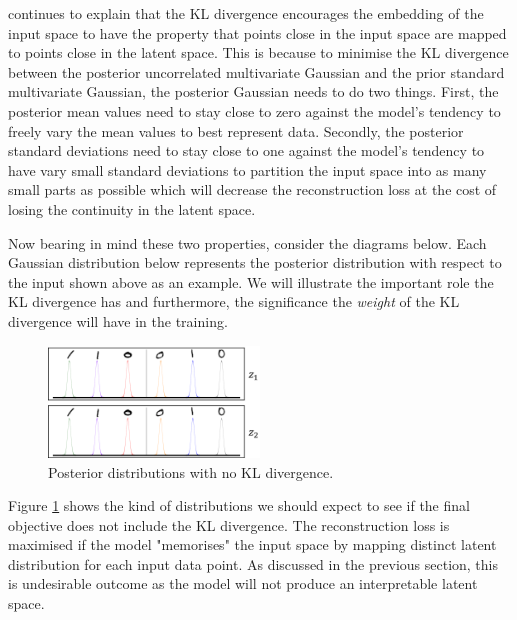             \cite{burgess2018understanding} continues to explain that the KL divergence encourages the embedding of the input space to have the property that points close in the input space are mapped to points close in the latent space. This is because to minimise the KL divergence between the posterior uncorrelated multivariate Gaussian and the prior standard multivariate Gaussian, the posterior Gaussian needs to do two things. First, the posterior mean values need to stay close to zero against the model's tendency to freely vary the mean values to best represent data. Secondly, the posterior standard deviations need to stay close to one against the model's tendency to have vary small standard deviations to partition the input space into as many small parts as possible which will decrease the reconstruction loss at the cost of losing the continuity in the latent space.
            
            Now bearing in mind these two properties, consider the diagrams below. Each Gaussian distribution below represents the posterior distribution with respect to the input shown above as an example. We will illustrate the important role the KL divergence has and furthermore, the significance the \textit{weight} of the KL divergence will have in the training.
            
            \begin{figure}[H]
                \centering
                \includegraphics[width=0.5\textwidth]{imgs/1d_beta_size1.png}
                \caption{Posterior distributions with no KL divergence.}
                \label{fig:1d_beta_size1}
            \end{figure}
            
            Figure \ref{fig:1d_beta_size1} shows the kind of distributions we should expect to see if the final objective does not include the KL divergence. The reconstruction loss is maximised if the model "memorises" the input space by mapping distinct latent distribution for each input data point. As discussed in the previous section, this is undesirable outcome as the model will not produce an interpretable latent space.
            
